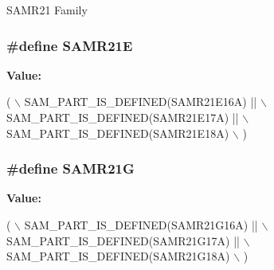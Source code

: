S\-A\-M\-R21 Family \hypertarget{group__sam__part__macros__group_ga29500011ca9cccd91d5131b74ba45ece}{
\subsubsection[{S\-A\-M\-R21\-E}]{\setlength{\rightskip}{0pt plus 5cm}\#define S\-A\-M\-R21\-E}}\label{group__sam__part__macros__group_ga29500011ca9cccd91d5131b74ba45ece}
{\bfseries Value\-:}
\begin{DoxyCode}
( \(\backslash\)
                SAM\_PART\_IS\_DEFINED(SAMR21E16A) || \(\backslash\)
                SAM\_PART\_IS\_DEFINED(SAMR21E17A) || \(\backslash\)
                SAM\_PART\_IS\_DEFINED(SAMR21E18A) \(\backslash\)
        )
\end{DoxyCode}
\hypertarget{group__sam__part__macros__group_gad414d7dfda114b1381015378bb6a5665}{
\subsubsection[{S\-A\-M\-R21\-G}]{\setlength{\rightskip}{0pt plus 5cm}\#define S\-A\-M\-R21\-G}}\label{group__sam__part__macros__group_gad414d7dfda114b1381015378bb6a5665}
{\bfseries Value\-:}
\begin{DoxyCode}
( \(\backslash\)
                SAM\_PART\_IS\_DEFINED(SAMR21G16A) || \(\backslash\)
                SAM\_PART\_IS\_DEFINED(SAMR21G17A) || \(\backslash\)
                SAM\_PART\_IS\_DEFINED(SAMR21G18A) \(\backslash\)
        )
\end{DoxyCode}
